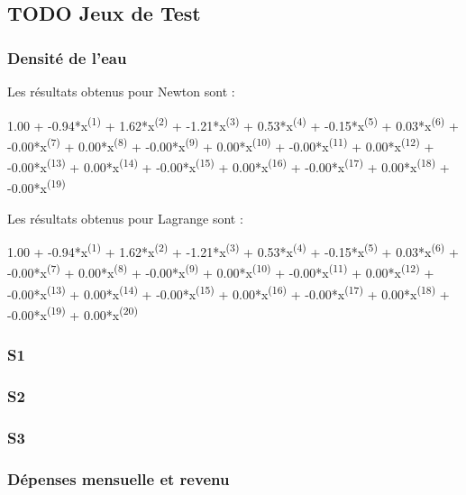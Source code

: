 \documentclass[letter]{article}
\begin{document}
\subsection{{\bfseries\sffamily TODO} Jeux de Test}
\label{sec:org01371bb}

\subsubsection{Densité de l'eau}
\label{sec:org2e037b0}

Les résultats obtenus pour Newton sont :

1.00 +  -0.94*x\textsuperscript{(1)}  +   1.62*x\textsuperscript{(2)}  +  -1.21*x\textsuperscript{(3)}  +   0.53*x\textsuperscript{(4)}  +  -0.15*x\textsuperscript{(5)}  +   0.03*x\textsuperscript{(6)}  +  -0.00*x\textsuperscript{(7)}  +   0.00*x\textsuperscript{(8)}  +  -0.00*x\textsuperscript{(9)}  +   0.00*x\textsuperscript{(10)}  +  -0.00*x\textsuperscript{(11)}  +   0.00*x\textsuperscript{(12)}  +  -0.00*x\textsuperscript{(13)}  +   0.00*x\textsuperscript{(14)}  +  -0.00*x\textsuperscript{(15)}  +   0.00*x\textsuperscript{(16)}  +  -0.00*x\textsuperscript{(17)}  +   0.00*x\textsuperscript{(18)}  +  -0.00*x\textsuperscript{(19)}

Les résultats obtenus pour Lagrange sont :

1.00 +  -0.94*x\textsuperscript{(1)}  +   1.62*x\textsuperscript{(2)}  +  -1.21*x\textsuperscript{(3)}  +   0.53*x\textsuperscript{(4)}  +  -0.15*x\textsuperscript{(5)}  +   0.03*x\textsuperscript{(6)}  +  -0.00*x\textsuperscript{(7)}  +   0.00*x\textsuperscript{(8)}  +  -0.00*x\textsuperscript{(9)}  +   0.00*x\textsuperscript{(10)}  +  -0.00*x\textsuperscript{(11)}  +   0.00*x\textsuperscript{(12)}  +  -0.00*x\textsuperscript{(13)}  +   0.00*x\textsuperscript{(14)}  +  -0.00*x\textsuperscript{(15)}  +   0.00*x\textsuperscript{(16)}  +  -0.00*x\textsuperscript{(17)}  +   0.00*x\textsuperscript{(18)}  +  -0.00*x\textsuperscript{(19)}  +   0.00*x\textsuperscript{(20)} 

\subsubsection{S1}
\label{sec:org160fedf}


\subsubsection{S2}
\label{sec:org6fe5d8c}
\subsubsection{S3}
\label{sec:org4a405d7}
\subsubsection{Dépenses mensuelle et revenu}
\label{sec:org9af7daa}
\end{document}

